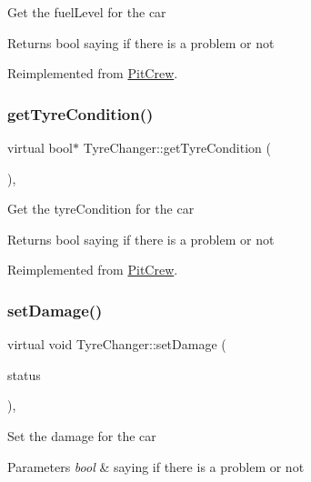 Get the fuel\+Level for the car \begin{DoxyReturn}{Returns}
bool saying if there is a problem or not 
\end{DoxyReturn}


Reimplemented from \mbox{\hyperlink{class_pit_crew_a6960d91ce635df7f846301e21ae64450}{Pit\+Crew}}.

\mbox{\label{class_tyre_changer_afdd2bc9ac35d7e5449a9e0c5ee39b450}} 
\subsubsection{\texorpdfstring{get\+Tyre\+Condition()}{getTyreCondition()}}
{\footnotesize\ttfamily virtual bool$\ast$ Tyre\+Changer\+::get\+Tyre\+Condition (\begin{DoxyParamCaption}{ }\end{DoxyParamCaption})\hspace{0.3cm}{\ttfamily [inline]}, {\ttfamily [virtual]}}

Get the tyre\+Condition for the car \begin{DoxyReturn}{Returns}
bool saying if there is a problem or not 
\end{DoxyReturn}


Reimplemented from \mbox{\hyperlink{class_pit_crew_a7a527a6b4eccb6570dcad04b04dc1177}{Pit\+Crew}}.

\mbox{\label{class_tyre_changer_ac89db968d57e823330886acbabb65b32}} 
\subsubsection{\texorpdfstring{set\+Damage()}{setDamage()}}
{\footnotesize\ttfamily virtual void Tyre\+Changer\+::set\+Damage (\begin{DoxyParamCaption}\item[{bool}]{status }\end{DoxyParamCaption})\hspace{0.3cm}{\ttfamily [inline]}, {\ttfamily [virtual]}}

Set the damage for the car 
\begin{DoxyParams}{Parameters}
{\em bool} & saying if there is a problem or not \\
\hline
\end{DoxyParams}


